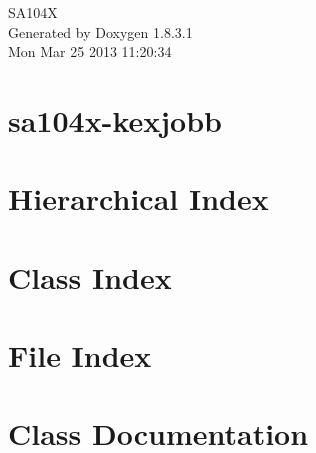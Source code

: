 \documentclass{book}
\begin{document}
\hypersetup{pageanchor=false,citecolor=blue}
\begin{titlepage}
\vspace*{7cm}
\begin{center}
{\Large S\-A104\-X }\\
\vspace*{1cm}
{\large Generated by Doxygen 1.8.3.1}\\
\vspace*{0.5cm}
{\small Mon Mar 25 2013 11:20:34}\\
\end{center}
\end{titlepage}
\clearemptydoublepage
{}
\tableofcontents
\clearemptydoublepage
{}
\hypersetup{pageanchor=true,citecolor=blue}
\chapter{sa104x-\/kexjobb}
\label{md_README}
\hypertarget{md_README}{}

\chapter{Hierarchical Index}

\chapter{Class Index}

\chapter{File Index}

\chapter{Class Documentation}








\end{document}
